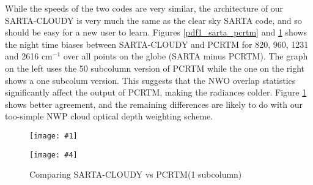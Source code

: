 \documentclass[11pt]{article}
\newcommand{\sa}{\textsf{SARTA}\xspace}
\newcommand{\sasc}{\textsf{SARTA-CLOUDY}\xspace}
\newcommand{\pcrtm}{\textsf{PCRTM}\xspace}
\newcommand{\dfigure}[6]
{
\begin{figure}
  \begin{minipage}[t]{0.47\textwidth}
  \centering
  \texttt{[image: \#1]}
   \caption{#2}  \label{#3}
  \end{minipage}
  \hfil
  \begin{minipage}[t]{0.47\linewidth}
  \centering
  \texttt{[image: \#4]}
   \caption{#5}  \label{#6}
  \end{minipage}
\end{figure}
}
\newcommand{\wn}{cm$^{-1}$\xspace}
\begin{document}




While the speeds of the two codes are very similar, the architecture
of our \sasc is very much the same as the clear sky \sa code, and so
should be easy for a new user to learn. Figures \ref{pdf1_sarta_pcrtm}
and \ref{pdf2_sarta_pcrtm} shows the night time biases between \sasc
and \pcrtm for 820, 960, 1231 and 2616 \wn over all points on the
globe (SARTA minus PCRTM). The graph on the left uses the 50 subcolumn
version of \pcrtm while the one on the right shows a one subcolum
version.  This suggests that the NWO overlap statistics significantly
affect the output of PCRTM, making the radiances colder.  Figure
\ref{pdf2_sarta_pcrtm} shows better agreement, and the remaining
differences are likely to do with our too-simple NWP cloud optical depth
weighting scheme.

\dfigure{Figs/pcrtm_calc_vs_sarta_calc_histV1.jpg}{Comparing \sasc vs
  \pcrtm (50
  subcolumns)}{pdf1_sarta_pcrtm}{Figs/pcrtm_calc_vs_sarta_calc_histV2.jpg}{Comparing
  \sasc vs \pcrtm (1 subcolumn)}{pdf2_sarta_pcrtm}
\end{document}

